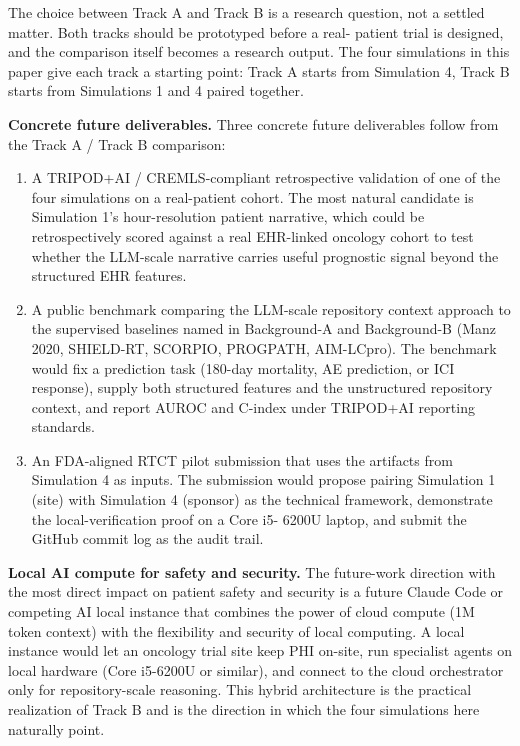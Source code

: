 The choice between Track A and Track B is a research question, not a
settled matter. Both tracks should be prototyped before a real-
patient trial is designed, and the comparison itself becomes a
research output. The four simulations in this paper give each track
a starting point: Track A starts from Simulation 4, Track B starts
from Simulations 1 and 4 paired together.

\textbf{Concrete future deliverables.} Three concrete future
deliverables follow from the Track A / Track B comparison:

\begin{enumerate}[leftmargin=*]
\item A TRIPOD+AI / CREMLS-compliant retrospective validation of one
of the four simulations on a real-patient cohort. The most natural
candidate is Simulation 1's hour-resolution patient narrative, which
could be retrospectively scored against a real EHR-linked oncology
cohort to test whether the LLM-scale narrative carries useful
prognostic signal beyond the structured EHR features.

\item A public benchmark comparing the LLM-scale repository context
approach to the supervised baselines named in Background-A and
Background-B (Manz 2020, SHIELD-RT, SCORPIO, PROGPATH, AIM-LCpro).
The benchmark would fix a prediction task (180-day mortality, AE
prediction, or ICI response), supply both structured features and
the unstructured repository context, and report AUROC and C-index
under TRIPOD+AI reporting standards.

\item An FDA-aligned RTCT pilot submission that uses the artifacts
from Simulation 4 as inputs. The submission would propose pairing
Simulation 1 (site) with Simulation 4 (sponsor) as the technical
framework, demonstrate the local-verification proof on a Core i5-
6200U laptop, and submit the GitHub commit log as the audit trail.
\end{enumerate}

\textbf{Local AI compute for safety and security.} The future-work
direction with the most direct impact on patient safety and security
is a future Claude Code or competing AI local instance that
combines the power of cloud compute (1M token context) with the
flexibility and security of local computing. A local instance would
let an oncology trial site keep PHI on-site, run specialist agents
on local hardware (Core i5-6200U or similar), and connect to the
cloud orchestrator only for repository-scale reasoning. This hybrid
architecture is the practical realization of Track B and is the
direction in which the four simulations here naturally point.


